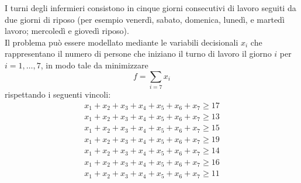 \documentclass[a4paper]{extarticle}
\begin{document}
\vspace{1em}
\noindent
I turni degli infermieri consistono in cinque giorni consecutivi di lavoro seguiti da due giorni di riposo (per esempio venerdì, sabato, domenica, lunedì, e martedì lavoro; mercoledì e giovedì riposo).\\
Il problema può essere modellato mediante le variabili decisionali $x_i$ che rappresentano il numero di persone che iniziano il turno di
lavoro il giorno $i$ per $i = 1,\dots,7$, in modo tale da minimizzare
\[f = \sum_{i=7} x_i\]
rispettando i seguenti vincoli:
\begin{align*}
    x_1+x_2+x_3+x_4+x_5+x_6+x_7 \geq 17\\
    x_1+x_2+x_3+x_4+x_5+x_6+x_7 \geq 13\\
    x_1+x_2+x_3+x_4+x_5+x_6+x_7 \geq 15\\
    x_1+x_2+x_3+x_4+x_5+x_6+x_7 \geq 19\\
    x_1+x_2+x_3+x_4+x_5+x_6+x_7 \geq 14\\
    x_1+x_2+x_3+x_4+x_5+x_6+x_7 \geq 16\\
    x_1+x_2+x_3+x_4+x_5+x_6+x_7 \geq 11
\end{align*}

\vspace{1em}
\noindent
\end{document}
